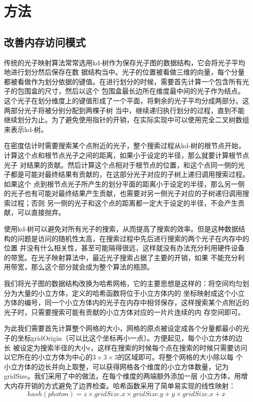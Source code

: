 \documentclass[UTF8]{ctexart}
\begin{document}
\section{方法}
    \subsection{改善内存访问模式}
        传统的光子映射算法\cite{jensen2000practical}常常选用kd-树\cite{1975Multidimensional}作为保存光子图的数据结构，它会将光子平均地进行划分然后保存在数
        据结构当中。光子的位置被看做三维的向量，每个分量都被看做作为划分依据的键值。在进行划分的时候，需要首先计算一个包含所有光子的包围盒的尺寸，然后以这个
        包围盒最长边所在维度最中间的光子作为结点。这个光子在划分维度上的键值形成了一个平面，将剩余的光子平均分成两部分。这两部分光子将被分别分配到两棵子树
        当中，继续递归执行划分的过程，直到不能继续划分为止。为了避免使用指针的开销，在实际实现中可以使用完全二叉树数组来表示kd-树。
        
        在密度估计时需要搜索某个点附近的光子，整个搜索过程从kd-树的根节点开始，计算这个点和根节点光子之间的距离，如果小于设定的半径，那么就要计算根节点光子
        对结果的贡献。然后计算这个点相对于根节点的位置，和这个点同一侧的光子都是可能对最终结果有贡献的，在这部分光子对应的子树上递归调用搜索过程。如果这个
        点到根节点光子所产生的划分平面的距离小于设定的半径，那么另一侧的光子也有可能对最终结果产生贡献，也需要对另一侧光子对应的子树递归调用搜索过程；否则
        另一侧的光子和这个点的距离都一定大于设定的半径，不会产生贡献，可以直接抛弃。
        
        使用kd-树可以避免对所有光子的搜索，从而提高了搜索的效率。但是这种数据结构的问题是访问的随机性太高，在搜索过程中先后进行搜索的两个光子在内存中的位置
        并没有什么相关性，甚至可能隔得很远，这样就没有办法充分利用硬件设备的带宽。在光子映射算法中，最近光子搜索占据了主要的开销\cite{gupte2011real}，如果
        不能充分利用带宽，那么这个部分就会成为整个算法的瓶颈。
        
        我们将光子图的数据结构改换为哈希网格\cite{fleisz2009photon}，它的主要思想是这样的：将空间均匀划分为大量的小立方体，定义的哈希函数将位于小立方体内的
        坐标映射成这个小立方体的编号，同一个小立方体内的光子在内存中相邻保存，这样搜索某个点附近的光子时，只需要搜索可能有贡献的小立方体对应的一片片连续的内
        存空间即可。
        
        为此我们需要首先计算整个网格的大小，网格的原点被设定成各个分量都最小的光子的坐标gridOrigin（可以比这个坐标再小一点）。方便起见，每个小立方体的边长
        被设定为搜索半径的大小r，这样在搜索的时候每个点在搜索的时候只需要访问以它所在的小立方体为中心的$3\times3\times3$的区域即可。将整个网格的大小除以每
        个小立方体的边长并向上取整，可以获得网格各个维度的小立方体数量，记为gridSize。我们采用了\cite{gupte2011real}中的做法，在每个维度的两端额外添加一层
        小立方体，用增大内存开销的方式避免了边界检查。哈希函数采用了简单易实现的线性映射：
        \begin{equation}
        hash(photon)=z \times gridSize.x \times gridSize.y + y \times gridSize.x + x
        \label{equ:2}
        \end{equation}
        
\end{document}
